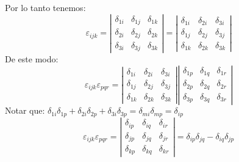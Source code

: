\documentclass[../main]{subfiles}
\begin{document}
Por lo tanto tenemos:
\begin{equation}
    \varepsilon_{ijk}=
    \left|
    \begin{array}{lll}
    \delta_{1i} & \delta_{1j} & \delta_{1k}\\
    \delta_{2i} & \delta_{2j} & \delta_{2k} \\
    \delta_{3i} & \delta_{3j} & \delta_{3k}
    \end{array}
    \right|=
    \left|
    \begin{array}{lll}
    \delta_{1i} & \delta_{2i} & \delta_{3i}\\
    \delta_{1j} & \delta_{2j} & \delta_{3j} \\
    \delta_{1k} & \delta_{2k} & \delta_{3k}
    \end{array}
    \right|
\end{equation}
De este modo:
\begin{equation}
    \varepsilon_{ijk}\varepsilon_{pqr}=
    \left|
    \begin{array}{lll}
    \delta_{1i} & \delta_{2i} & \delta_{3i}\\
    \delta_{1j} & \delta_{2j} & \delta_{3j} \\
    \delta_{1k} & \delta_{2k} & \delta_{3k}
    \end{array}
    \right|
    \left|
    \begin{array}{lll}
    \delta_{1p} & \delta_{1q} & \delta_{1r}\\
    \delta_{2p} & \delta_{2q} & \delta_{2r} \\
    \delta_{3p} & \delta_{3q} & \delta_{3r}
    \end{array}
    \right|
\end{equation}
Notar que: $\delta_{1i}\delta_{1p}+\delta_{2i}\delta_{2p}+\delta_{3i}\delta_{3p}=\delta_{mi}\delta_{mp}=\delta_{ip}$
\begin{equation}
    \varepsilon_{ijk}\varepsilon_{pqr}=
    \left|
    \begin{array}{lll}
    \delta_{ip} & \delta_{iq} & \delta_{ir}\\
    \delta_{jp} & \delta_{jq} & \delta_{jr} \\
    \delta_{kp} & \delta_{kq} & \delta_{kr}
    \end{array}
    \right|
    =\delta_{ip}\delta_{jq}-\delta_{iq}\delta_{jp}
\end{equation}
\end{document}
